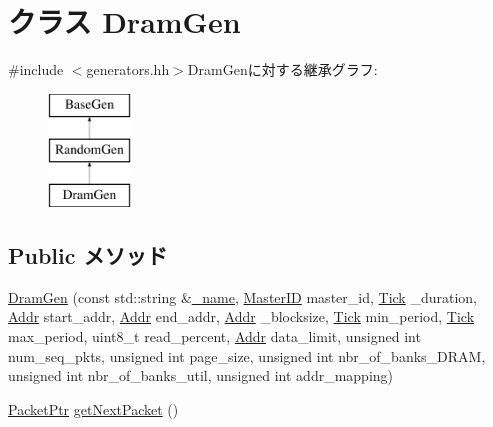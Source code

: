 \hypertarget{classDramGen}{
\section{クラス DramGen}
\label{classDramGen}
}


{\ttfamily \#include $<$generators.hh$>$}DramGenに対する継承グラフ:\begin{figure}[H]
\begin{center}
\leavevmode
\includegraphics[height=3cm]{classDramGen}
\end{center}
\end{figure}
\subsection*{Public メソッド}
\begin{DoxyCompactItemize}
\item 
\hyperlink{classDramGen_afc7f569fe1b2004371d6c159a9bdcba7}{DramGen} (const std::string \&\hyperlink{classBaseGen_a1b003dc5cfce1a4d8f9a0c4b9b589045}{\_\-name}, \hyperlink{request_8hh_ac366b729262fd8e7cbd3283da6f775cf}{MasterID} master\_\-id, \hyperlink{base_2types_8hh_a5c8ed81b7d238c9083e1037ba6d61643}{Tick} \_\-duration, \hyperlink{base_2types_8hh_af1bb03d6a4ee096394a6749f0a169232}{Addr} start\_\-addr, \hyperlink{base_2types_8hh_af1bb03d6a4ee096394a6749f0a169232}{Addr} end\_\-addr, \hyperlink{base_2types_8hh_af1bb03d6a4ee096394a6749f0a169232}{Addr} \_\-blocksize, \hyperlink{base_2types_8hh_a5c8ed81b7d238c9083e1037ba6d61643}{Tick} min\_\-period, \hyperlink{base_2types_8hh_a5c8ed81b7d238c9083e1037ba6d61643}{Tick} max\_\-period, uint8\_\-t read\_\-percent, \hyperlink{base_2types_8hh_af1bb03d6a4ee096394a6749f0a169232}{Addr} data\_\-limit, unsigned int num\_\-seq\_\-pkts, unsigned int page\_\-size, unsigned int nbr\_\-of\_\-banks\_\-DRAM, unsigned int nbr\_\-of\_\-banks\_\-util, unsigned int addr\_\-mapping)
\item 
\hyperlink{classPacket}{PacketPtr} \hyperlink{classDramGen_a938aa9841a9a62a776afbd0768af5379}{getNextPacket} ()
\end{DoxyCompactItemize}
